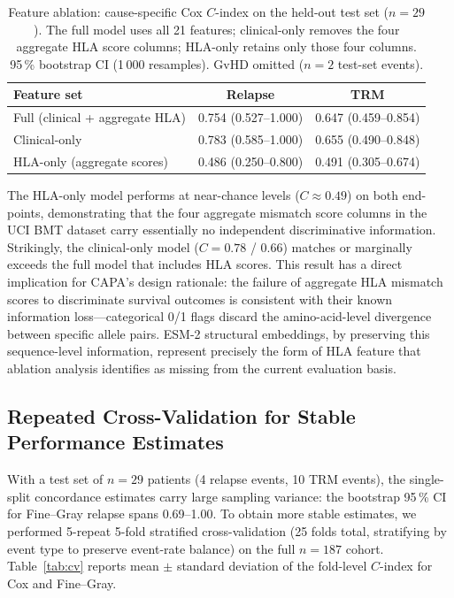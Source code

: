 \documentclass[11pt,a4paper]{article}
\begin{document}
\begin{table}[t!]
  \caption{Feature ablation: cause-specific Cox $C$-index on the held-out test
    set ($n=29$).  The full model uses all 21 features; clinical-only removes
    the four aggregate HLA score columns; HLA-only retains only those four
    columns.  95\,\% bootstrap CI (1\,000 resamples).  GvHD omitted ($n=2$
    test-set events).}
  \label{tab:ablation}
  \begin{tabular}{lcc}
    \toprule
    \textbf{Feature set} & \textbf{Relapse} & \textbf{TRM} \\
    \midrule
    Full (clinical + aggregate HLA) & 0.754 (0.527--1.000) & 0.647 (0.459--0.854) \\
    Clinical-only                   & 0.783 (0.585--1.000) & 0.655 (0.490--0.848) \\
    HLA-only (aggregate scores)     & 0.486 (0.250--0.800) & 0.491 (0.305--0.674) \\
    \bottomrule
  \end{tabular}
\end{table}

The HLA-only model performs at near-chance levels ($C \approx 0.49$) on both
end-points, demonstrating that the four aggregate mismatch score columns in the
UCI BMT dataset carry essentially no independent discriminative information.
Strikingly, the clinical-only model ($C = 0.78$ / $0.66$) matches or marginally
exceeds the full model that includes HLA scores.  This result has a direct
implication for CAPA's design rationale: the failure of aggregate HLA mismatch
scores to discriminate survival outcomes is consistent with their known
information loss---categorical 0/1 flags discard the amino-acid-level
divergence between specific allele pairs.  ESM-2 structural embeddings, by
preserving this sequence-level information, represent precisely the form of HLA
feature that ablation analysis identifies as missing from the current evaluation
basis.

\subsection{Repeated Cross-Validation for Stable Performance Estimates}
\label{sec:cv}

With a test set of $n = 29$ patients (4 relapse events, 10 TRM events), the
single-split concordance estimates carry large sampling variance: the
bootstrap 95\,\% CI for Fine--Gray relapse spans 0.69--1.00.  To obtain more
stable estimates, we performed 5-repeat 5-fold stratified cross-validation
(25 folds total, stratifying by event type to preserve event-rate balance) on
the full $n = 187$ cohort.  Table~\ref{tab:cv} reports mean $\pm$ standard
deviation of the fold-level $C$-index for Cox and Fine--Gray.
\end{document}
